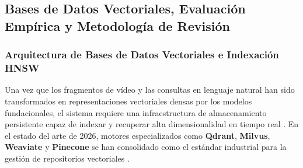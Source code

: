 
\subsection{Bases de Datos Vectoriales, Evaluación Empírica y Metodología de Revisión}
\label{subsec:bases_datos_metricas}

\subsubsection{Arquitectura de Bases de Datos Vectoriales e Indexación HNSW}
\label{subsubsec:bases_datos_vectoriales_hnsw}

Una vez que los fragmentos de vídeo y las consultas en lenguaje natural han sido transformados en representaciones vectoriales densas por los modelos fundacionales, el sistema requiere una infraestructura de almacenamiento persistente capaz de indexar y recuperar alta dimensionalidad en tiempo real \cite{gemini_emb2_docs, qwen3_vl_emb2026}. %
En el estado del arte de 2026, motores especializados como \textbf{Qdrant}, \textbf{Milvus}, \textbf{Weaviate} y \textbf{Pinecone} se han consolidado como el estándar industrial para la gestión de repositorios vectoriales \cite{gemini_emb2_docs}. %

